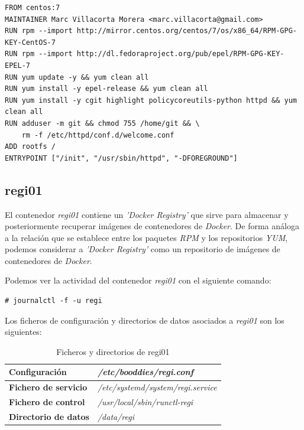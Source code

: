 \documentclass[a4paper,12pt,spanish,final]{epsc_tfc_pfc}
\begin{document}
\begin{lstlisting}[style=dnsmasq]
FROM centos:7
MAINTAINER Marc Villacorta Morera <marc.villacorta@gmail.com>
RUN rpm --import http://mirror.centos.org/centos/7/os/x86_64/RPM-GPG-KEY-CentOS-7
RUN rpm --import http://dl.fedoraproject.org/pub/epel/RPM-GPG-KEY-EPEL-7
RUN yum update -y && yum clean all
RUN yum install -y epel-release && yum clean all
RUN yum install -y cgit highlight policycoreutils-python httpd && yum clean all
RUN adduser -m git && chmod 755 /home/git && \
    rm -f /etc/httpd/conf.d/welcome.conf
ADD rootfs /
ENTRYPOINT ["/init", "/usr/sbin/httpd", "-DFOREGROUND"]
\end{lstlisting}

\subsection{regi01}

El contenedor \emph{regi01} contiene un \emph{'Docker Registry'} que sirve para almacenar y posteriormente recuperar imágenes de contenedores de \emph{Docker}. De forma análoga a la relación que se establece entre los paquetes \emph{RPM} y los repositorios \emph{YUM}, podemos considerar a \emph{'Docker Registry'} como un repositorio de imágenes de contenedores de \emph{Docker}.

Podemos ver la actividad del contenedor \emph{regi01} con el siguiente comando:\\

\begin{lstlisting}[style=dnsmasq]
# journalctl -f -u regi
\end{lstlisting}

Los ficheros de configuración y directorios de datos asociados a \emph{regi01} son los siguientes:

\begin{table}[h]

  \centering

  \begin{tabular}{ll}
    \toprule
    \textbf{Configuración}        & \textit{/etc/booddies/regi.conf}          \\
    \midrule
    \rowcolor[HTML]{EFEFEF}
    \textbf{Fichero de servicio}  & \textit{/etc/systemd/system/regi.service} \\
    \midrule
    \textbf{Fichero de control}   & \textit{/usr/local/sbin/runctl-regi}      \\
    \midrule
    \rowcolor[HTML]{EFEFEF}
    \textbf{Directorio de datos}  & \textit{/data/regi}                       \\
    \bottomrule
  \end{tabular}

  \caption{Ficheros y directorios de regi01}

\end{table}
\end{document}
